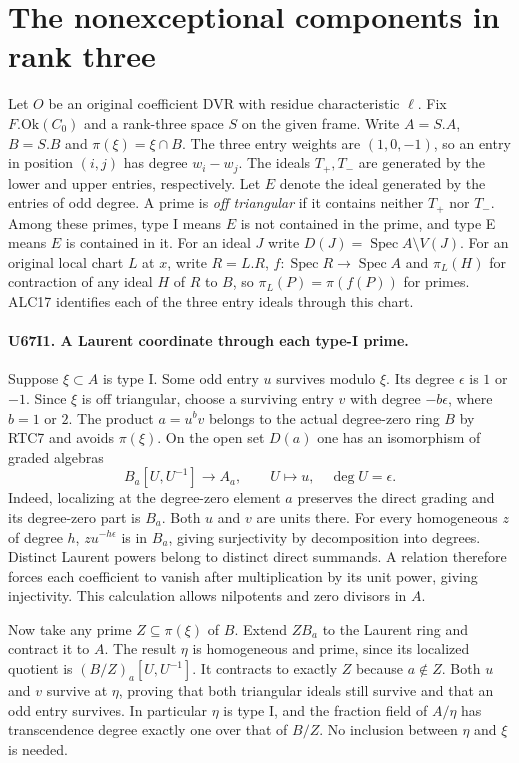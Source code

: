 \section{The nonexceptional components in rank three}

Let $O$ be an original coefficient DVR with residue characteristic
$\ell$. Fix $F.\mathrm{Ok}(C_0)$ and a rank-three space $S$ on the
given frame. Write $A=S.A$, $B=S.B$ and $\pi(\xi)=\xi\cap B$.
The three entry weights are $(1,0,-1)$, so an entry in position
$(i,j)$ has degree $w_i-w_j$. The ideals $T_+,T_-$ are generated
by the lower and upper entries, respectively. Let $E$ denote the
ideal generated by the entries of odd degree. A prime is
\emph{off triangular} if it contains neither $T_+$ nor $T_-$.
Among these primes, type I means $E$ is not contained in the
prime, and type E means $E$ is contained in it.
For an ideal $J$ write $D(J)=\operatorname{Spec}A\setminus V(J)$.
For an original local chart $L$ at $x$, write $R=L.R$,
$f:\operatorname{Spec}R\to\operatorname{Spec}A$ and
$\pi_L(H)$ for contraction of any ideal $H$ of $R$ to $B$,
so $\pi_L(P)=\pi(f(P))$ for primes.  ALC17 identifies each of the three entry
ideals through this chart.

\paragraph{U67I1. A Laurent coordinate through each type-I prime.}
Suppose $\xi\subset A$ is type I. Some odd entry $u$ survives
modulo $\xi$. Its degree $\epsilon$ is $1$ or $-1$. Since $\xi$
is off triangular, choose a surviving entry $v$ with degree
$-b\epsilon$, where $b=1$ or $2$. The product $a=u^b v$ belongs
to the actual degree-zero ring $B$ by RTC7 and avoids $\pi(\xi)$.
On the open set $D(a)$ one has an isomorphism of graded algebras
\[
                     B_a[U,U^{-1}]\longrightarrow A_a,
                \qquad U\longmapsto u,\quad \deg U=\epsilon .
\]
Indeed, localizing at the degree-zero element $a$ preserves the
direct grading and its degree-zero part is $B_a$. Both $u$ and $v$
are units there. For every homogeneous $z$ of degree $h$,
$zu^{-h\epsilon}$ is in $B_a$, giving surjectivity by decomposition
into degrees. Distinct Laurent powers belong to distinct direct
summands. A relation therefore forces each coefficient to vanish
after multiplication by its unit power, giving injectivity.
This calculation allows nilpotents and zero divisors in $A$.

Now take any prime $Z\subseteq\pi(\xi)$ of $B$. Extend $ZB_a$
to the Laurent ring and contract it to $A$. The result $\eta$ is
homogeneous and prime, since its localized quotient is
$(B/Z)_a[U,U^{-1}]$. It contracts to exactly $Z$ because
$a\notin Z$. Both $u$ and $v$ survive at $\eta$, proving that
both triangular ideals still survive and that an odd entry survives.
In particular $\eta$ is type I, and the fraction field of $A/\eta$
has transcendence degree exactly one over that of $B/Z$.
No inclusion between $\eta$ and $\xi$ is needed.

